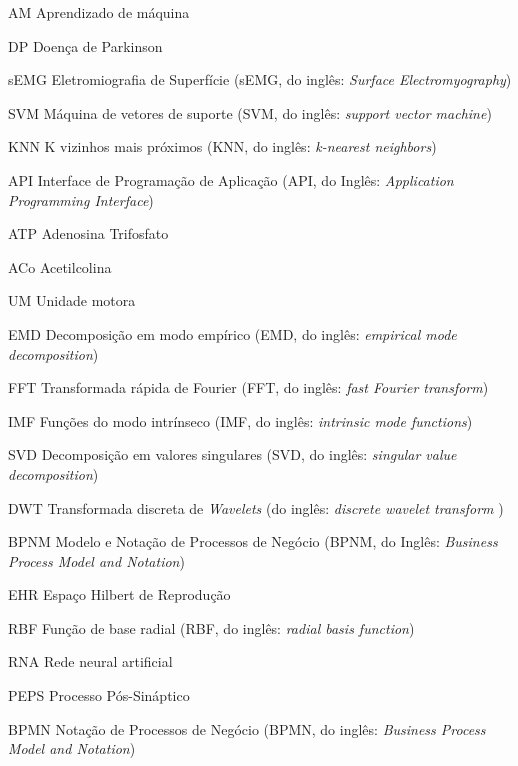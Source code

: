 \begin{siglas}
  \item[AM] Aprendizado de máquina
  \item[DP] Doença de Parkinson
  \item[sEMG] Eletromiografia de Superfície (sEMG, do inglês: \textit{Surface Electromyography})
  \item[SVM] Máquina de vetores de suporte (SVM, do inglês: \textit{support vector machine}) 
  \item[KNN] K vizinhos mais próximos (KNN, do inglês: \textit{k-nearest neighbors}) 
  \item[API] Interface de Programação de Aplicação (API, do Inglês: \textit{Application Programming Interface})
  \item[ATP] Adenosina Trifosfato
  \item[ACo] Acetilcolina
  \item[UM] Unidade motora
  \item[EMD] Decomposição em modo empírico (EMD, do inglês: \textit{empirical mode decomposition})
  \item[FFT] Transformada rápida de Fourier (FFT, do inglês: \textit{fast Fourier transform}) 
  \item[IMF] Funções do modo intrínseco (IMF, do inglês: \textit{intrinsic mode functions})
  \item[SVD] Decomposição em valores singulares (SVD, do inglês: \textit{singular value decomposition})
  \item[DWT] Transformada discreta de \textit{Wavelets} (do inglês: \textit{discrete wavelet transform })
  \item[BPNM] Modelo e Notação de Processos de Negócio (BPNM, do Inglês: \textit{Business Process Model and Notation})
  \item[EHR] Espaço Hilbert de Reprodução
  \item[RBF] Função de base radial (RBF, do inglês: \textit{radial basis function})
  \item[RNA] Rede neural artificial
  \item[PEPS] Processo Pós-Sináptico
  \item[BPMN] Notação de Processos de Negócio (BPMN, do inglês: \textit{Business Process Model and Notation})
\end{siglas}
